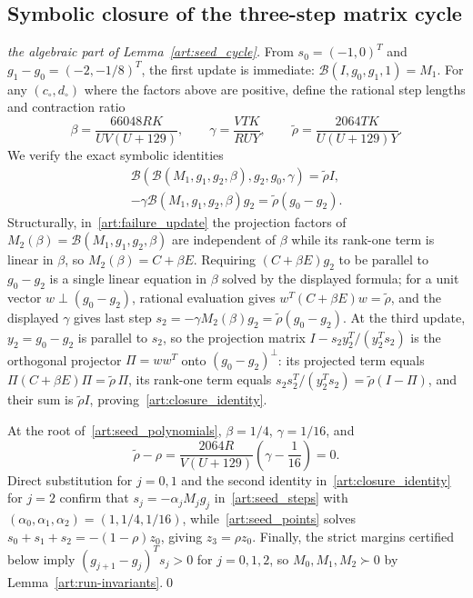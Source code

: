 \subsection{Symbolic closure of the three-step matrix cycle}
\begin{proof}[the algebraic part of Lemma~\ref{art:seed_cycle}]
From $s_0=(-1,0)^T$ and $g_1-g_0=(-2,-1/8)^T$, the first update is immediate:
$\mathcal B(I,g_0,g_1,1)=M_1$. For any $(c_\circ,d_\circ)$ where the factors
above are positive, define the rational step lengths and contraction ratio
\[
 \beta=\frac{66048RK}{UV(U+129)},\qquad
 \gamma=\frac{VTK}{RUY},\qquad
 \widetilde\rho=\frac{2064TK}{U(U+129)Y}.
\]
We verify the exact symbolic identities
\begin{equation}\label{art:closure_identity}
 \begin{gathered}
 \mathcal B(\mathcal B(M_1,g_1,g_2,\beta),g_2,g_0,\gamma)
     =\widetilde\rho I,\\
 -\gamma\mathcal B(M_1,g_1,g_2,\beta)g_2
     =\widetilde\rho(g_0-g_2).
 \end{gathered}
\end{equation}
Structurally, in~\eqref{art:failure_update} the projection factors of
$M_2(\beta)=\mathcal B(M_1,g_1,g_2,\beta)$ are independent of $\beta$ while its
rank-one term is linear in $\beta$, so $M_2(\beta)=C+\beta E$. Requiring
$(C+\beta E)g_2$ to be parallel to $g_0-g_2$ is a single linear equation in
$\beta$ solved by the displayed formula; for a unit vector $w\perp(g_0-g_2)$,
rational evaluation gives $w^T(C+\beta E)w=\widetilde\rho$, and the displayed
$\gamma$ gives last step $s_2=-\gamma M_2(\beta)g_2=\widetilde\rho(g_0-g_2)$. At
the third update, $y_2=g_0-g_2$ is parallel to $s_2$, so the projection matrix
$I-s_2y_2^T/(y_2^Ts_2)$ is the orthogonal projector $\Pi=ww^T$ onto
$(g_0-g_2)^\perp$: its projected term equals $\Pi(C+\beta E)\Pi=\widetilde\rho\,\Pi$,
its rank-one term equals $s_2s_2^T/(y_2^Ts_2)=\widetilde\rho(I-\Pi)$, and their
sum is $\widetilde\rho I$, proving~\eqref{art:closure_identity}.

At the root of~\eqref{art:seed_polynomials}, $\beta=1/4$, $\gamma=1/16$, and
\[
 \widetilde\rho-\rho=
 \frac{2064R}{V(U+129)}\left(\gamma-\frac1{16}\right)=0.
\]
Direct substitution for $j=0,1$ and the second identity in~\eqref{art:closure_identity}
for $j=2$ confirm that $s_j=-\alpha_jM_jg_j$ in~\eqref{art:seed_steps} with
$(\alpha_0,\alpha_1,\alpha_2)=(1,1/4,1/16)$, while~\eqref{art:seed_points} solves
$s_0+s_1+s_2=-(1-\rho)z_0$, giving $z_3=\rho z_0$. Finally, the strict margins
certified below imply $(g_{j+1}-g_j)^Ts_j>0$ for $j=0,1,2$, so $M_0,M_1,M_2\succ0$
by Lemma~\ref{art:run-invariants}.\qed
\end{proof}

